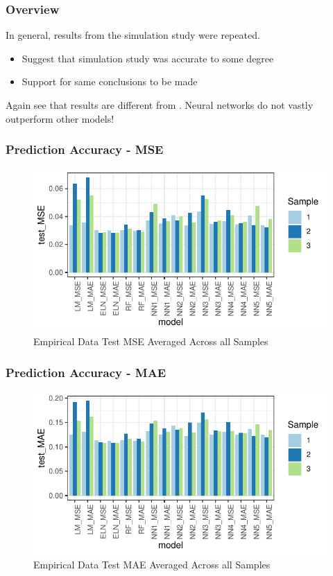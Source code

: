 \documentclass[aspectratio=169]{beamer}
\begin{document}
\begin{frame}
\frametitle{Overview}

In general, results from the simulation study were repeated.

\begin{itemize}
	\item Suggest that simulation study was accurate to some degree
	\item Support for same conclusions to be made
\end{itemize}

Again see that results are different from \cite{gu_empirical_2018}. Neural networks do not vastly outperform other models!

\end{frame}


\begin{frame}
\frametitle{Prediction Accuracy - MSE}
\begin{figure}
\includegraphics{empirical_test_mse.pdf}
\caption{Empirical Data Test MSE Averaged Across all Samples}
\end{figure}
\end{frame}

\begin{frame}
\frametitle{Prediction Accuracy - MAE}
\begin{figure}
	\includegraphics{empirical_test_mae.pdf}
	\caption{Empirical Data Test MAE Averaged Across all Samples}
\end{figure}
\end{frame}
\end{document}
